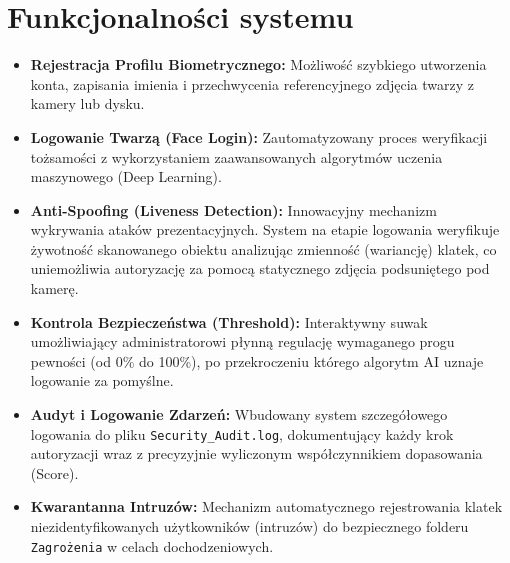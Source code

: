 \section{Funkcjonalności systemu}
\begin{itemize}
    \item \textbf{Rejestracja Profilu Biometrycznego:} Możliwość szybkiego utworzenia konta, zapisania imienia i przechwycenia referencyjnego zdjęcia twarzy z kamery lub dysku.
    \item \textbf{Logowanie Twarzą (Face Login):} Zautomatyzowany proces weryfikacji tożsamości z wykorzystaniem zaawansowanych algorytmów uczenia maszynowego (Deep Learning).
    \item \textbf{Anti-Spoofing (Liveness Detection):} Innowacyjny mechanizm wykrywania ataków prezentacyjnych. System na etapie logowania weryfikuje żywotność skanowanego obiektu analizując zmienność (wariancję) klatek, co uniemożliwia autoryzację za pomocą statycznego zdjęcia podsuniętego pod kamerę.
    \item \textbf{Kontrola Bezpieczeństwa (Threshold):} Interaktywny suwak umożliwiający administratorowi płynną regulację wymaganego progu pewności (od 0\% do 100\%), po przekroczeniu którego algorytm AI uznaje logowanie za pomyślne.
    \item \textbf{Audyt i Logowanie Zdarzeń:} Wbudowany system szczegółowego logowania do pliku \texttt{Security\_Audit.log}, dokumentujący każdy krok autoryzacji wraz z precyzyjnie wyliczonym współczynnikiem dopasowania (Score).
    \item \textbf{Kwarantanna Intruzów:} Mechanizm automatycznego rejestrowania klatek niezidentyfikowanych użytkowników (intruzów) do bezpiecznego folderu \texttt{Zagrożenia} w celach dochodzeniowych.
\end{itemize}
